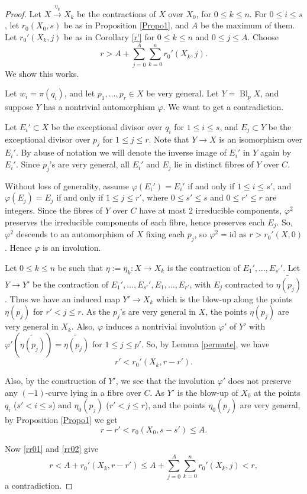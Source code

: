 \documentclass[11pt,letterpaper]{amsart}
\begin{document}
\begin{proof}
Let $X\xrightarrow{\eta_k}X_k$ be the contractions of $X$ over $X_0$, for
$0\le k\le n$. For $0\leq i\leq s$, let $r_0(X_0,s)$ be as in Proposition \ref{Propo1}, and $A$ be the maximum of them. Let $r_0'(X_k,j)$ be as in Corollary \ref{r'} for $0\leq k\leq n$ and $0\leq j\leq A$. Choose
\[
r>A+\sum_{j=0}^{A}\sum_{k=0}^{n}r_0'(X_k,j).
\]
We show this works.

Let $w_i=\pi(q_i)$, and let $p_1,\ldots,p_r\in X$ be very general. Let $Y=\operatorname{Bl}_{\underline{p}}X$, and suppose $Y$ has a nontrivial automorphism $\varphi$. We want to get a contradiction.

Let $E_i'\subset X$ be the exceptional divisor over $q_i$ for $1\le i\le s$, and $E_j\subset Y$ be the exceptional divisor over $p_j$ for $1\le j\le r$. Note that $Y\to X$ is an isomorphism over $E_i'$. By abuse of notation we will denote the inverse image of $E_i'$ in $Y$ again by $E_i'$. Since $p_j$'s are very general, all $E_i'$ and $E_j$ lie in distinct fibres of $Y$ over $C$.

Without loss of generality, assume $\varphi(E_i')=E_i'$ if and only if $1\le i\le s'$, and $\varphi(E_j)=E_j$ if and only if $1\le j\le r'$, where $0\le s'\le s$ and $0\le r'\le r$ are integers. Since the fibres of $Y$ over $C$ have at most $2$ irreducible components, $\varphi^2$ preserves the irreducible components of each fibre, hence preserves each $E_j$. So, $\varphi^2$ descends to an automorphism of $X$ fixing each $p_j$, so $\varphi^2=\mathrm{id}$ as $r>r_0'(X,0)$. Hence $\varphi$ is an involution.

Let $0\le k\le n$ be such that $\eta:=\eta_k:X\to X_k$ is the contraction of $E_1',\ldots,E_{s'}'$. Let $Y\to Y'$ be the contraction of $E_1',\ldots,E_{s'}',E_1,\ldots,E_{r'}$, with $E_j$ contracted to $\widetilde{\eta(p_j)}$. Thus we have an induced map $Y'\to X_k$ which is the blow-up along the points $\eta(p_j)$ for $r'<j\le r$. As the $p_j$'s are very general in $X$, the points $\eta(p_j)$ are very general in $X_k$. Also, $\varphi$ induces a nontrivial involution $\varphi'$ of $Y'$ with $\varphi'(\widetilde{\eta(p_j)})=\widetilde{\eta(p_j)}$ for $1\le j\le p'$. So, by Lemma \ref{permute}, we have
\begin{equation}\label{rr01}
r' < r_0'(X_k,r-r'). 
\end{equation}

Also, by the construction of $Y'$, we see that the involution $\varphi'$ does not preserve any $(-1)$-curve lying in a fibre over $C$. As $Y'$ is the blow-up of $X_0$ at the points $q_i$ ($s'<i\le s$) and $\eta_0(p_j)$ ($r'<j\le r$), and the points $\eta_0(p_j)$ are very general, by Proposition \ref{Propo1} we get
\begin{equation}\label{rr02}
r-r' < r_0(X_0,s-s') \le A.
\end{equation}

Now \eqref{rr01} and \eqref{rr02} give
\[
r <A + r_0'(X_k,r-r')
   \le A+\sum_{j=0}^{A}\sum_{k=0}^{n} r_0'(X_k,j)<r,
\]
a contradiction. 
\end{proof}
\end{document}
